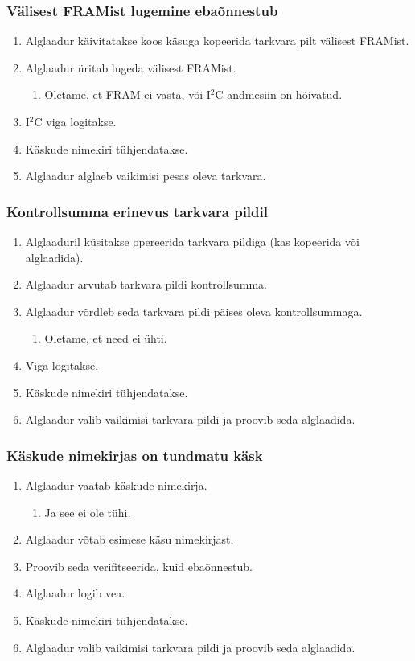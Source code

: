 \documentclass[12pt,a4paper]{article}
\newcommand{\iic}{I${}^2$C }
\begin{document}
\subsubsection{Välisest FRAMist lugemine ebaõnnestub}
\begin{enumerate}
	\item Alglaadur käivitatakse koos käsuga kopeerida tarkvara pilt välisest
		FRAMist.
	\item Alglaadur üritab lugeda välisest FRAMist.
		\begin{enumerate}
		\item Oletame, et FRAM ei vasta, või \iic andmesiin on hõivatud.
		\end{enumerate}
	\item \iic viga logitakse.
	\item Käskude nimekiri tühjendatakse.
	\item Alglaadur alglaeb vaikimisi pesas oleva tarkvara.
\end{enumerate}

\subsubsection{Kontrollsumma erinevus tarkvara pildil}
\begin{enumerate}
	\item Alglaaduril küsitakse opereerida tarkvara pildiga (kas kopeerida või
		alglaadida).
	\item Alglaadur arvutab tarkvara pildi kontrollsumma.
	\item Alglaadur võrdleb seda tarkvara pildi päises oleva kontrollsummaga.
		\begin{enumerate}
			\item Oletame, et need ei ühti.
		\end{enumerate}
	\item Viga logitakse.
	\item Käskude nimekiri tühjendatakse.
	\item Alglaadur valib vaikimisi tarkvara pildi ja proovib seda alglaadida.
\end{enumerate}

\subsubsection{Käskude nimekirjas on tundmatu käsk}
\begin{enumerate}
	\item Alglaadur vaatab käskude nimekirja.
		\begin{enumerate}
			\item Ja see ei ole tühi.
		\end{enumerate}
	\item Alglaadur võtab esimese käsu nimekirjast.
	\item Proovib seda verifitseerida, kuid ebaõnnestub.
	\item Alglaadur logib vea.
	\item Käskude nimekiri tühjendatakse.
	\item Alglaadur valib vaikimisi tarkvara pildi ja proovib seda alglaadida.
\end{enumerate}
\end{document}
